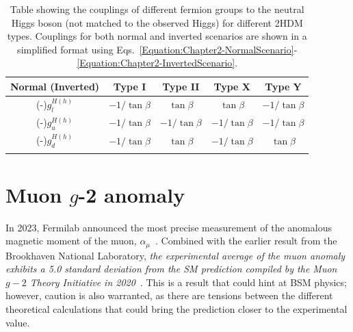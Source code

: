 \begin{table}[h]
\centering
\renewcommand{\arraystretch}{1.5} %
\setlength{\tabcolsep}{12pt} %
\begin{tabular}{|c|c|c|c|c|}
\hline
Normal (Inverted)     & Type I                     & Type II                     & Type X                                        & Type Y                      \\ \hline \hline
(-)$g_l^{H(h)}$ & $-1/\tan{\beta}$  & $\tan{\beta}$  & $\tan{\beta}$                    & $-1/\tan{\beta}$  \\ \arrayrulecolor{lightgray} \hline
(-)$g_u^{H(h)}$ & $-1/\tan{\beta}$  & $-1/\tan{\beta}$  & $-1/\tan{\beta}$                    & $-1/\tan{\beta}$  \\ \arrayrulecolor{lightgray} \hline
(-)$g_d^{H(h)}$ & $-1/\tan{\beta}$  & $\tan{\beta}$  & $-1/\tan{\beta}$                    & $\tan{\beta}$  \\ \arrayrulecolor{black} \hline
\end{tabular}
\caption[Neutral Higgs–fermion couplings for different Two-Higgs Doublet Model types]{Table showing the couplings of different fermion groups to the neutral Higgs boson (not matched to the observed Higgs) for different \ac{2HDM} types. Couplings for both normal and inverted scenarios are shown in a simplified format using Eqs.~\ref{Equation:Chapter2-NormalScenario}-\ref{Equation:Chapter2-InvertedScenario}.}
\label{Table:Chapter2_2HDM-CouplingsAlignmentLimit}
\end{table}

\section{\texorpdfstring{Muon $g$-2 anomaly}{Muon g-2 anomaly}}
\label{Section:Chapter2_gminus2}
In 2023, Fermilab announced the most precise measurement of the anomalous magnetic moment of the muon, $\alpha_\mu$~\cite{Fermilab_g-2}. Combined with the earlier result from the Brookhaven National Laboratory, \textit{the experimental average of the muon anomaly exhibits a 5.0 standard deviation from the \ac{SM} prediction compiled by the Muon $g-2$ Theory Initiative in 2020}~\cite{Muon_Theory_Initiative}. This is a result that could hint at \ac{BSM} physics; however, caution is also warranted, as there are tensions between the different theoretical calculations that could bring the prediction closer to the experimental value.


